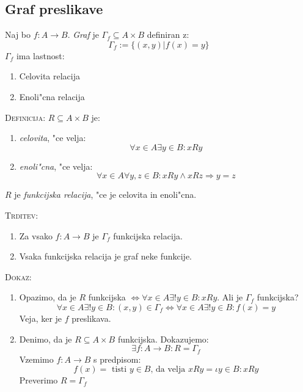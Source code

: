 \subsection{Graf preslikave}
Naj bo $f: A \to B$. \emph{Graf} je $\Gamma_f \subseteq A \times B$ definiran z:
\begin{equation*}
\Gamma_f := \{(x, y)| f(x) = y\}
\end{equation*}
$\Gamma_f$ ima lastnost:
\begin{enumerate}
	\item Celovita relacija
	\item Enoli"cna relacija
\end{enumerate}
\textsc{Definicija:} $R \subseteq A \times B$ je:
\begin{enumerate}
	\item \emph{celovita}, "ce velja:
	\begin{equation*}
	\forall x \in A \exists y \in B: x R y
	\end{equation*}
	
	\item \emph{enoli"cna}, "ce velja:
	\begin{equation*}
	\forall x \in A \forall y, z \in B: x R y \land x R z \Rightarrow y = z
	\end{equation*}
\end{enumerate}
$R$ je \emph{funkcijska relacija}, "ce je celovita in enoli"cna.

\textsc{Trditev:}
\begin{enumerate}
	\item Za vsako $f: A \to B$ je $\Gamma_f$ funkcijska relacija.
	\item Vsaka funkcijska relacija je graf neke funkcije.
\end{enumerate}
\textsc{Dokaz:}
\begin{enumerate}
	\item Opazimo, da je $R$ funkcijska $\iff \forall x \in A \exists! y \in B: x R y$. Ali je $\Gamma_f$ funkcijska?
	\begin{equation*}
	\forall x \in A \exists! y \in B: (x, y) \in \Gamma_f \iff \forall x \in A \exists! y \in B: f(x) = y
	\end{equation*}
	Veja, ker je $f$ preslikava.
	
	\item Denimo, da je $R \subseteq A \times B$ funkcijska. Dokazujemo:
	\begin{equation*}
	\exists f : A \to B: R = \Gamma_f
	\end{equation*}
	Vzemimo $f: A \to B$ s predpisom:
	\begin{equation*}
	f(x) = \text{ tisti $y \in B$, da velja $x R y$} = \iota y \in B: x R y
	\end{equation*}
	Preverimo $R = \Gamma_f$
\end{enumerate}

